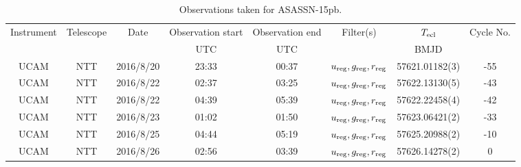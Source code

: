 \begin{table}
	\begin{center}
		\caption{Observations taken for ASASSN-15pb.}
		\label{table:observing:observation logs ASASSN-15pb}
		\begin{tabular}{cccccccc}
			\hline
			Instrument & Telescope & Date & Observation start & Observation end & Filter(s) & $T_{\rm ecl}$ & Cycle No. \\
			 &  &  & UTC & UTC &  & BMJD &  \\
			\hline
			\hline
			UCAM & NTT & 2016/8/20 & 23:33 & 00:37 & $u_{\rm reg},g_{\rm reg},r_{\rm reg}$ & 57621.01182(3) & -55 \\
			UCAM & NTT & 2016/8/22 & 02:37 & 03:25 & $u_{\rm reg},g_{\rm reg},r_{\rm reg}$ & 57622.13130(5) & -43 \\
			UCAM & NTT & 2016/8/22 & 04:39 & 05:39 & $u_{\rm reg},g_{\rm reg},r_{\rm reg}$ & 57622.22458(4) & -42 \\
			UCAM & NTT & 2016/8/23 & 01:02 & 01:50 & $u_{\rm reg},g_{\rm reg},r_{\rm reg}$ & 57623.06421(2) & -33 \\
			UCAM & NTT & 2016/8/25 & 04:44 & 05:19 & $u_{\rm reg},g_{\rm reg},r_{\rm reg}$ & 57625.20988(2) & -10 \\
			UCAM & NTT & 2016/8/26 & 02:56 & 03:39 & $u_{\rm reg},g_{\rm reg},r_{\rm reg}$ & 57626.14278(2) &   0 \\
		   \hline
		\end{tabular}
	\end{center}
\end{table}
